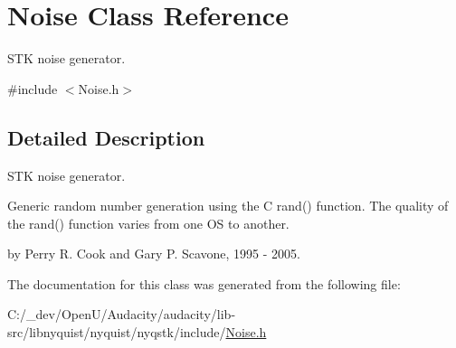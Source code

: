 \hypertarget{class_noise}{}\section{Noise Class Reference}
\label{class_noise}


S\+TK noise generator.  




{\ttfamily \#include $<$Noise.\+h$>$}



\subsection{Detailed Description}
S\+TK noise generator. 

Generic random number generation using the C rand() function. The quality of the rand() function varies from one OS to another.

by Perry R. Cook and Gary P. Scavone, 1995 -\/ 2005. 

The documentation for this class was generated from the following file\+:\begin{DoxyCompactItemize}
\item 
C\+:/\+\_\+dev/\+Open\+U/\+Audacity/audacity/lib-\/src/libnyquist/nyquist/nyqstk/include/\hyperlink{lib-src_2libnyquist_2nyquist_2nyqstk_2include_2_noise_8h}{Noise.\+h}\end{DoxyCompactItemize}
